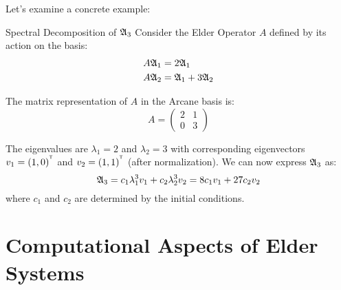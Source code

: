 \begin{twocolumnlayout}
Let's examine a concrete example:

\begin{examplebox}{Spectral Decomposition of $\mathfrak{A}_{3}$}{}
Consider the Elder Operator $A$ defined by its action on the basis:
\begin{align}
A\mathfrak{A}_{1} &= 2\mathfrak{A}_{1} \\
A\mathfrak{A}_{2} &= \mathfrak{A}_{1} + 3\mathfrak{A}_{2}
\end{align}

The matrix representation of $A$ in the Arcane basis is:
\begin{equation}
A = \begin{pmatrix}
2 & 1 \\
0 & 3
\end{pmatrix}
\end{equation}

The eigenvalues are $\lambda_1 = 2$ and $\lambda_2 = 3$ with corresponding eigenvectors $v_1 = (1, 0)^{^{\mathsf{T}}}$ and $v_2 = (1, 1)^{^{\mathsf{T}}}$ (after normalization). We can now express $\mathfrak{A}_{3}$ as:
\begin{equation}
\mathfrak{A}_{3} = c_1 \lambda_1^3 v_1 + c_2 \lambda_2^3 v_2 = 8c_1 v_1 + 27c_2 v_2
\end{equation}
where $c_1$ and $c_2$ are determined by the initial conditions.
\end{examplebox}

\end{twocolumnlayout}

\section{Computational Aspects of Elder Systems}

